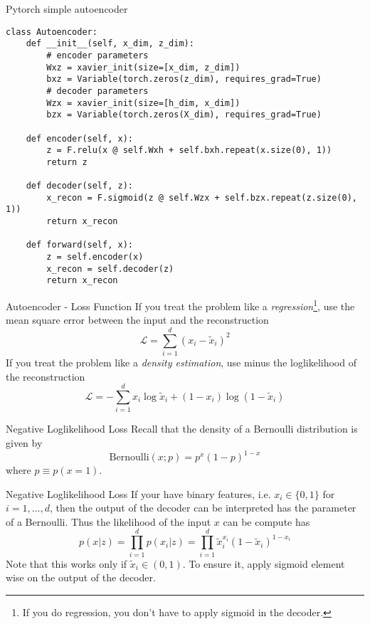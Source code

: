 \documentclass{beamer}
\newcommand{\bernoulli}{\mathrm{Bernoulli}}
\begin{document}
\begin{frame}[fragile]{Pytorch simple autoencoder}
\begin{verbatim}
class Autoencoder:
    def __init__(self, x_dim, z_dim):
        # encoder parameters
        Wxz = xavier_init(size=[x_dim, z_dim])
        bxz = Variable(torch.zeros(z_dim), requires_grad=True)
        # decoder parameters
        Wzx = xavier_init(size=[h_dim, x_dim])
        bzx = Variable(torch.zeros(X_dim), requires_grad=True)
    
    def encoder(self, x):
        z = F.relu(x @ self.Wxh + self.bxh.repeat(x.size(0), 1))
        return z
    
    def decoder(self, z):
        x_recon = F.sigmoid(z @ self.Wzx + self.bzx.repeat(z.size(0), 1))
        return x_recon
    
    def forward(self, x):
        z = self.encoder(x)
        x_recon = self.decoder(z)
        return x_recon
\end{verbatim}
\end{frame}

\begin{frame}{Autoencoder - Loss Function}
If you treat the problem like a \textit{regression}\footnote{If you do regression, you don't have to apply sigmoid in the decoder.}, use the mean square error between the input and the reconstruction
\begin{equation}
	\mathcal{L} = \sum_{i=1}^d (x_i-\tilde{x}_i)^2
\end{equation}
If you treat the problem like a \textit{density estimation}, use minus the loglikelihood of the reconstruction
\begin{equation}
\mathcal{L} = -\sum_{i=1}^d x_i\log\tilde{x}_i + (1-x_i)\log(1-\tilde{x}_i) 
\end{equation}
\end{frame}

\begin{frame}{Negative Loglikelihood Loss}
Recall that the density of a Bernoulli distribution is given by 
\begin{equation}
\bernoulli(x;p) = p^x(1-p)^{1-x}
\end{equation}
where $p\equiv p(x=1)$.
\end{frame}

\begin{frame}{Negative Loglikelihood Loss}
If your have binary features, i.e. $x_i\in \{0,1\}$ for $i=1,...,d$, then the output of the decoder can be interpreted has the parameter of a Bernoulli. Thus the likelihood of the input $x$ can be compute has 
\begin{equation}
p(x|z)=\prod_{i=1}^dp(x_i|z) = \prod_{i=1}^d\tilde{x}_i^{x_i}(1-\tilde{x}_i)^{1-x_i}
\end{equation}
Note that this works only if $\tilde{x}_i\in (0, 1)$. To ensure it, apply sigmoid element wise on the output of the decoder.
\end{frame}
\end{document}
